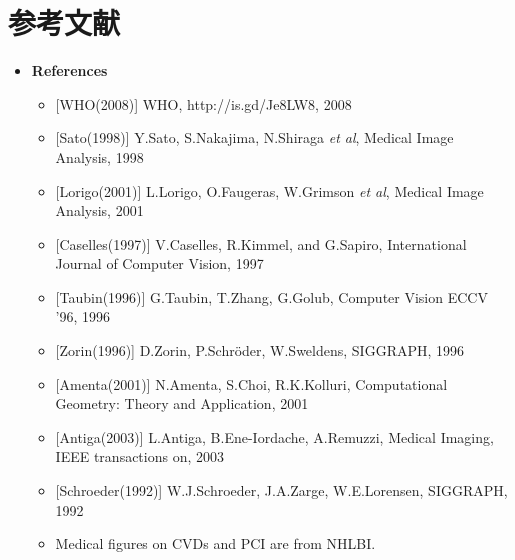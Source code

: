 \section{参考文献}

\begin{frame}
\begin{itemize}
\item \footnotesize\textbf{References}
\begin{itemize}
\item \footnotesize{[WHO(2008)]       WHO, http://is.gd/Je8LW8, 2008}
\item \footnotesize{[Sato(1998)]      Y.Sato, S.Nakajima, N.Shiraga \textit{et al}, Medical Image Analysis, 1998}%
\item \footnotesize{[Lorigo(2001)]    L.Lorigo, O.Faugeras, W.Grimson \textit{et al}, Medical Image Analysis, 2001}
\item \footnotesize{[Caselles(1997)]  V.Caselles, R.Kimmel, and G.Sapiro, International Journal of Computer Vision, 1997}
\item \footnotesize{[Taubin(1996)]    G.Taubin, T.Zhang, G.Golub, Computer Vision ECCV '96, 1996}%
\item \footnotesize{[Zorin(1996)]     D.Zorin, P.Schr\"{o}der, W.Sweldens, SIGGRAPH, 1996}
\item \footnotesize{[Amenta(2001)]    N.Amenta, S.Choi, R.K.Kolluri, Computational Geometry: Theory and Application, 2001}
\item \footnotesize{[Antiga(2003)]    L.Antiga, B.Ene-Iordache, A.Remuzzi, Medical Imaging, IEEE transactions on, 2003}
\item \footnotesize{[Schroeder(1992)] W.J.Schroeder, J.A.Zarge, W.E.Lorensen, SIGGRAPH, 1992}
\item \footnotesize{Medical figures on CVDs and PCI are from NHLBI.}
\end{itemize}
\end{itemize}
\end{frame}